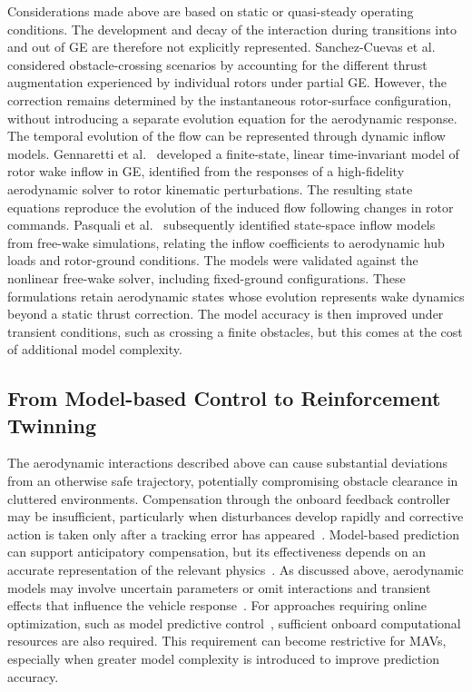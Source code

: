 \documentclass[journal]{IEEEtran}
\begin{document}
Considerations made above are based on static or quasi-steady operating conditions. The development and decay of the interaction during transitions into and out of GE are therefore not explicitly represented. Sanchez-Cuevas et al.~\cite{SanchezCuevas2017} considered obstacle-crossing scenarios by accounting for the different thrust augmentation experienced by individual rotors under partial GE. However, the correction remains determined by the instantaneous rotor-surface configuration, without introducing a separate evolution equation for the aerodynamic response.
The temporal evolution of the flow can be represented through dynamic inflow models. Gennaretti et al.~\cite{Gennaretti2017} developed a finite-state, linear time-invariant model of rotor wake inflow in GE, identified from the responses of a high-fidelity aerodynamic solver to rotor kinematic perturbations. The resulting state equations reproduce the evolution of the induced flow following changes in rotor commands. Pasquali et al.~\cite{Pasquali2023} subsequently identified state-space inflow models from free-wake simulations, relating the inflow coefficients to aerodynamic hub loads and rotor-ground conditions. The models were validated against the nonlinear free-wake solver, including fixed-ground configurations. These formulations retain aerodynamic states whose evolution represents wake dynamics beyond a static thrust correction. The model accuracy is then improved under transient conditions, such as crossing a finite obstacles, but this comes at the cost of additional model complexity.

\subsection{From Model-based Control to Reinforcement Twinning}
The aerodynamic interactions described above can cause substantial deviations from an otherwise safe trajectory, potentially compromising obstacle clearance in cluttered environments. Compensation through the onboard feedback controller may be insufficient, particularly when disturbances develop rapidly and corrective action is taken only after a tracking error has appeared~\cite{Quan2017}. Model-based prediction can support anticipatory compensation, but its effectiveness depends on an accurate representation of the relevant physics~\cite{Borrelli2017}. As discussed above, aerodynamic models may involve uncertain parameters or omit interactions and transient effects that influence the vehicle response~\cite{YangGE2025,HeDynamicGE2024}. For approaches requiring online optimization, such as model predictive control~\cite{MPCReview2021}, sufficient onboard computational resources are also required. This requirement can become restrictive for MAVs, especially when greater model complexity is introduced to improve prediction accuracy. 
\end{document}
